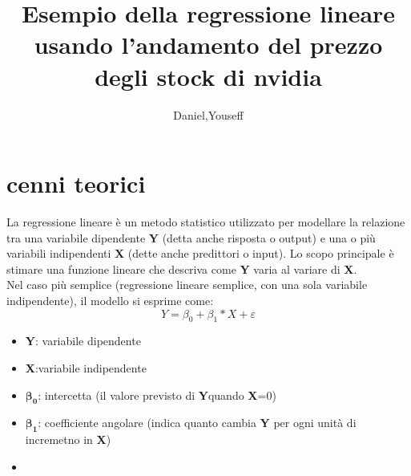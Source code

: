 \documentclass[12pt]{article}
\author{Daniel,Youseff}
\title{Esempio della regressione lineare usando l'andamento del prezzo degli stock di nvidia}
\begin{document}
\maketitle
\section{cenni teorici}
La regressione lineare è un metodo statistico utilizzato per modellare la relazione tra una variabile dipendente
\textbf{Y} (detta anche risposta o output) e una o più variabili indipendenti 
\textbf{X} (dette anche predittori o input). Lo scopo principale è stimare una funzione lineare che descriva come \textbf{Y} 
varia al variare di \textbf{X}.
\\Nel caso più semplice (regressione lineare semplice, con una sola variabile indipendente), il modello si esprime come:
\begin{equation}
    Y=\beta_0+\beta_1*X+\varepsilon  
\end{equation}
\begin{itemize}
    \item \textbf{Y}: variabile dipendente
    \item \textbf{X}:variabile indipendente
    \item \begin{math}\mathbf{\beta_0}\end{math}: intercetta (il valore previsto di \textbf{Y}quando \textbf{X}=0)
    \item \begin{math} \mathbf{\beta_1}\end{math}: coefficiente angolare (indica quanto cambia \textbf{Y} per ogni unità
          di incremetno in \textbf{X})
    \item 
\end{itemize}
\end{document}
